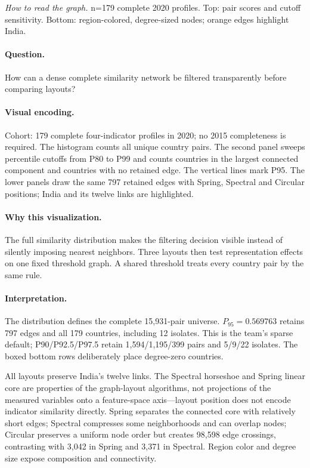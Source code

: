 \documentclass[conference,a4paper]{IEEEtran}
\begin{document}
\noindent\textit{How to read the graph.} n=179 complete 2020 profiles. Top: pair scores and cutoff sensitivity. Bottom: region-colored, degree-sized nodes; orange edges highlight India.

\paragraph{Question.} How can a dense complete similarity network be filtered transparently before comparing layouts?



\paragraph{Visual encoding.} Cohort: 179 complete four-indicator profiles in 2020; no 2015 completeness is required. The histogram counts all unique country pairs. The second panel sweeps percentile cutoffs from P80 to P99 and counts countries in the largest connected component and countries with no retained edge. The vertical lines mark P95. The lower panels draw the same 797 retained edges with Spring, Spectral and Circular positions; India and its twelve links are highlighted.



\paragraph{Why this visualization.} The full similarity distribution makes the filtering decision visible instead of silently imposing nearest neighbors. Three layouts then test representation effects on one fixed threshold graph. A shared threshold treats every country pair by the same rule.



\paragraph{Interpretation.} The distribution defines the complete 15,931-pair universe. $P_{95}=0.569763$ retains 797 edges and all 179 countries, including 12 isolates. This is the team's sparse default; P90/P92.5/P97.5 retain 1,594/1,195/399 pairs and 5/9/22 isolates. The boxed bottom rows deliberately place degree-zero countries.

All layouts preserve India's twelve links. The Spectral horseshoe and Spring linear core are properties of the graph-layout algorithms, not projections of the measured variables onto a feature-space axis---layout position does not encode indicator similarity directly. Spring separates the connected core with relatively short edges; Spectral compresses some neighborhoods and can overlap nodes; Circular preserves a uniform node order but creates 98,598 edge crossings, contrasting with 3,042 in Spring and 3,371 in Spectral. Region color and degree size expose composition and connectivity.
\end{document}
